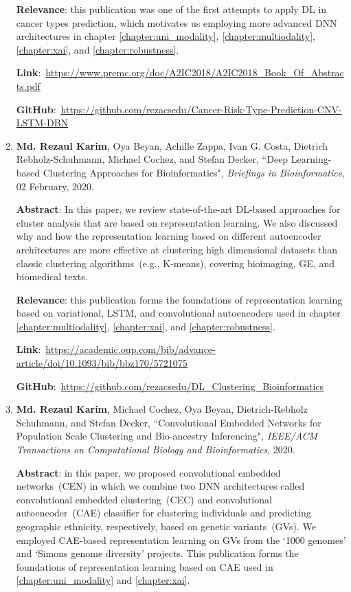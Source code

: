 \begin{enumerate}
	\textbf{Relevance}: this publication was one of the first attempts to apply DL in cancer types prediction, which motivates us employing more advanced DNN architectures in chapter \ref{chapter:uni_modality}, \ref{chapter:multiodality}, \ref{chapter:xai}, and \ref{chapter:robustness}.
	
	\textbf{Link}:~\url{https://www.premc.org/doc/A2IC2018/A2IC2018_Book_Of_Abstracts.pdf}
	
	\textbf{GitHub}:~\url{https://github.com/rezacsedu/Cancer-Risk-Type-Prediction-CNV-LSTM-DBN}
	
	\item \textbf{Md. Rezaul Karim}, Oya Beyan, Achille Zappa, Ivan G. Costa, Dietrich Rebholz-Schuhmann, Michael Cochez, and Stefan Decker, ``Deep Learning-based Clustering Approaches for Bioinformatics", \emph{Briefings in Bioinformatics}, 02 February, 2020.
	
	\textbf{Abstract}: In this paper, we review state-of-the-art DL-based approaches for cluster analysis that are based on representation learning. We also discussed why and how the representation learning based on different autoencoder architectures are more effective at clustering high dimensional datasets than classic clustering algorithms~(e.g., K-means), covering bioimaging, GE, and biomedical texts. 
	
	\textbf{Relevance}: this publication forms the foundations of representation learning based on variational, LSTM, and convolutional autoencoders used in chapter \ref{chapter:multiodality}, \ref{chapter:xai}, and \ref{chapter:robustness}.

	\textbf{Link}:~\url{https://academic.oup.com/bib/advance-article/doi/10.1093/bib/bbz170/5721075}
	
	\textbf{GitHub}:~\url{https://github.com/rezacsedu/DL_Clustering_Bioinformatics}
	
	\item \textbf{Md. Rezaul Karim}, Michael Cochez, Oya Beyan, Dietrich-Rebholz Schuhmann, and Stefan Decker, ``Convolutional Embedded Networks for Population Scale Clustering and Bio-ancestry Inferencing", \emph{IEEE/ACM Transactions on Computational Biology and Bioinformatics}, 2020.
	
	\textbf{Abstract}: in this paper, we proposed convolutional embedded networks~(CEN) in which we combine two DNN architectures called convolutional embedded clustering~(CEC) and convolutional autoencoder~(CAE) classifier for clustering individuals and predicting geographic ethnicity, respectively, based on genetic variants~(GVs). We employed CAE-based representation learning on GVs from the `1000 genomes' and `Simons genome diversity' projects. This publication forms the foundations of representation learning based on CAE used in \cref{chapter:uni_modality} and \cref{chapter:xai}.


\end{enumerate}
